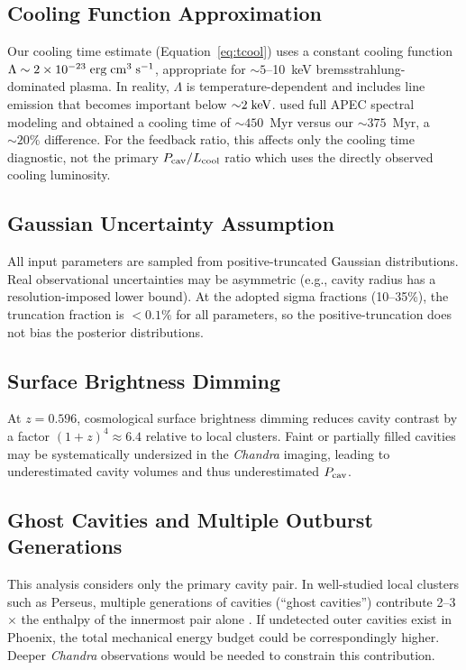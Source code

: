 \documentclass[twocolumn]{aastex63}
\newcommand{\Lcool}{L_{\rm cool}}
\newcommand{\Pcav}{P_{\rm cav}}
\newcommand{\keV}{\rm keV}
\newcommand{\erg}{\rm erg}
\newcommand{\s}{\rm s}
\newcommand{\cm}{\rm cm}
\begin{document}
\subsection{Cooling Function Approximation}

Our cooling time estimate (Equation~\ref{eq:tcool}) uses a constant cooling
function $\Lambda \sim 2 \times 10^{-23}\;\erg\;\cm^{3}\;\s^{-1}$, appropriate
for ${\sim}5$--10~keV bremsstrahlung-dominated plasma. In reality, $\Lambda$ is
temperature-dependent and includes line emission that becomes important below
${\sim}2\;\keV$. \citet{McDonald2019} used full APEC spectral modeling and
obtained a cooling time of ${\sim}450$~Myr versus our ${\sim}375$~Myr, a
${\sim}20\%$ difference. For the feedback ratio, this affects only the cooling
time diagnostic, not the primary $\Pcav/\Lcool$ ratio which uses the directly
observed cooling luminosity.

\subsection{Gaussian Uncertainty Assumption}

All input parameters are sampled from positive-truncated Gaussian distributions.
Real observational uncertainties may be asymmetric (e.g., cavity radius has a
resolution-imposed lower bound). At the adopted sigma fractions (10--35\%), the
truncation fraction is $<0.1\%$ for all parameters, so the positive-truncation
does not bias the posterior distributions.

\subsection{Surface Brightness Dimming}

At $z = 0.596$, cosmological surface brightness dimming reduces cavity contrast
by a factor $(1+z)^4 \approx 6.4$ relative to local clusters. Faint or partially
filled cavities may be systematically undersized in the \textit{Chandra} imaging,
leading to underestimated cavity volumes and thus underestimated $\Pcav$.

\subsection{Ghost Cavities and Multiple Outburst Generations}

This analysis considers only the primary cavity pair. In well-studied local
clusters such as Perseus, multiple generations of cavities (``ghost cavities'')
contribute 2--3$\times$ the enthalpy of the innermost pair alone
\citep{Fabian2006}. If undetected outer cavities exist in Phoenix, the total
mechanical energy budget could be correspondingly higher. Deeper \textit{Chandra}
observations would be needed to constrain this contribution.
\end{document}
